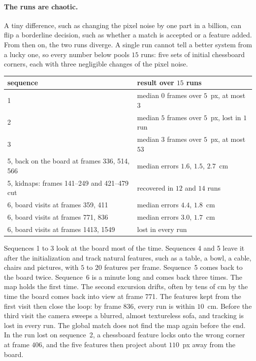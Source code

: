 \documentclass[11pt]{article}
\begin{document}
\paragraph{The runs are chaotic.}
A tiny difference, such as changing the pixel noise by one part in a billion, can flip a borderline
decision, such as whether a match is accepted or a feature added. From then on, the two runs diverge. A
single run cannot tell a better system from a lucky one, so every number below pools $15$ runs:
five sets of initial chessboard corners, each with three negligible changes of the pixel noise.

\begin{center}
\begin{tabular}{ll}
  sequence & result over $15$ runs \\
  \hline
    1 & median $0$ frames over $5$~px, at most $3$ \\
  2 & median $5$ frames over $5$~px, lost in $1$ run \\
  3 & median $3$ frames over $5$~px, at most $53$ \\
  5, back on the board at frames 336, 514, 566 & median errors $1.6$, $1.5$, $2.7$~cm \\
  5, kidnaps: frames 141--249 and 421--479 cut & recovered in $12$ and $14$ runs \\
  6, board visits at frames 359, 411 & median errors $4.4$, $1.8$~cm \\
  6, board visits at frames 771, 836 & median errors $3.0$, $1.7$~cm \\
  6, board visits at frames 1413, 1549 & lost in every run \\
\end{tabular}
\end{center}

Sequences 1 to 3 look at the board most of the time. Sequences 4 and 5 leave it after the
initialization and track natural features, such as a table, a bowl, a cable, chairs and pictures,
with $5$ to $20$ features per frame. Sequence~5 comes back to the board twice. Sequence~6 is a
minute long and comes back three times. The map holds the first time. The second excursion drifts,
often by tens of cm by the time the board comes back into view at frame 771. The features kept
from the first visit then close the loop: by frame 836, every run is within $10$~cm. Before
the third visit the camera sweeps a blurred, almost textureless sofa, and tracking is lost in every
run. The global match does not find the map again before the end. In the run lost on sequence~2, a
chessboard feature locks onto the wrong corner at frame $406$, and the five features then project
about $110$~px away from the board.
\end{document}
